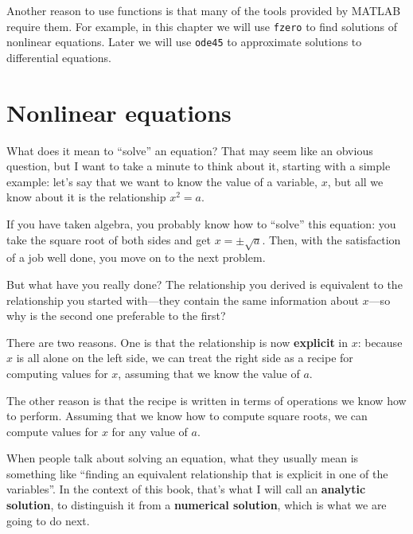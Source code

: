 \documentclass[
]{book}
\numberwithin{Answer}{chapter}
\numberwithin{Exercise}{chapter}
\begin{document}
Another reason to use functions is that many of the
tools provided by MATLAB require them.  For example,
in this chapter we will use {\tt fzero} to find solutions of nonlinear
equations.  Later we will use {\tt ode45} to approximate solutions to
differential equations.



\section{Nonlinear equations}


What does it mean to ``solve'' an equation?  That may seem like an
obvious question, but I want to take a minute to think about it,
starting with a simple example: let's say that we want to know the
value of a variable, $x$, but all we know about it is the relationship
$x^2 = a$.

If you have taken algebra, you probably know how to ``solve'' this
equation: you take the square root of both sides and get
$x = \pm \sqrt{a}$.  Then, with the satisfaction of a job well done,
you move on to the next problem.


But what have you really done?  The relationship you derived is
equivalent to the relationship you started with---they contain the
same information about $x$---so why is the second one preferable
to the first?

There are two reasons.  One is that the relationship is now {\bf explicit}
in $x$: because $x$ is all alone on the left side, we can treat
the right side as a recipe for computing values for $x$, assuming that we
know the value of $a$.


The other reason is that the recipe is written in terms of operations
we know how to perform.  Assuming that we know how to compute square
roots, we can compute values for $x$ for any value of $a$.

When people talk about solving an equation, what they usually mean
is something like ``finding an equivalent relationship that is
explicit in one of the variables''.  In the context of this book,
that's what I will call an {\bf analytic solution}, to distinguish
it from a {\bf numerical solution}, which is what we are going to
do next.

\end{document}
